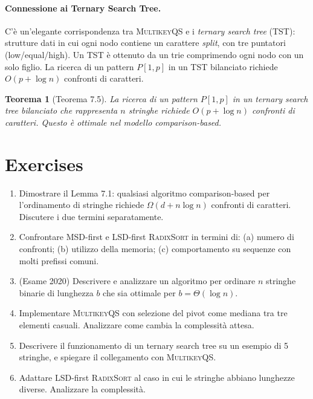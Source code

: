 \documentclass[12pt, a4paper, oneside]{book}
\theoremstyle{plain}
\newtheorem{teorema}{Teorema}[chapter]
\theoremstyle{definition}
\theoremstyle{remark}
\begin{document}
\paragraph{Connessione ai Ternary Search Tree.} C'è un'elegante corrispondenza tra \textsc{MultikeyQS} e i \emph{ternary search tree} (TST): strutture dati in cui ogni nodo contiene un carattere \emph{split}, con tre puntatori (low/equal/high). Un TST è ottenuto da un trie comprimendo ogni nodo con un solo figlio. La ricerca di un pattern $P[1,p]$ in un TST bilanciato richiede $O(p + \log n)$ confronti di caratteri.

\begin{teorema}[Teorema 7.5]
La ricerca di un pattern $P[1,p]$ in un ternary search tree bilanciato che rappresenta $n$ stringhe richiede $O(p + \log n)$ confronti di caratteri. Questo è ottimale nel modello comparison-based.
\end{teorema}

\section{Exercises}

\begin{enumerate}
  \item Dimostrare il Lemma 7.1: qualsiasi algoritmo comparison-based per l'ordinamento di stringhe richiede $\Omega(d + n\log n)$ confronti di caratteri. Discutere i due termini separatamente.

  \item Confrontare MSD-first e LSD-first \textsc{RadixSort} in termini di:
    (a) numero di confronti; (b) utilizzo della memoria; (c) comportamento su sequenze con molti prefissi comuni.

  \item (Esame 2020) Descrivere e analizzare un algoritmo per ordinare $n$ stringhe binarie di lunghezza $b$ che sia ottimale per $b = \Theta(\log n)$.

  \item Implementare \textsc{MultikeyQS} con selezione del pivot come mediana tra tre elementi casuali. Analizzare come cambia la complessità attesa.

  \item Descrivere il funzionamento di un ternary search tree su un esempio di 5 stringhe, e spiegare il collegamento con \textsc{MultikeyQS}.

  \item Adattare LSD-first \textsc{RadixSort} al caso in cui le stringhe abbiano lunghezze diverse. Analizzare la complessità.
\end{enumerate}
\end{document}
